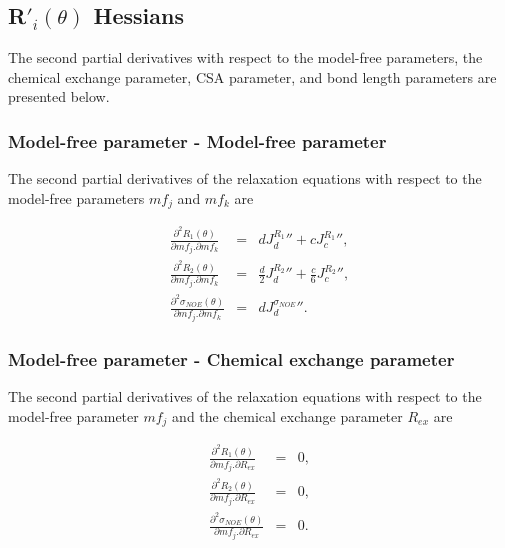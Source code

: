 
\subsection{R$'_i(\theta)$ Hessians}

The second partial derivatives with respect to the model-free parameters, the chemical exchange parameter, CSA parameter, and bond length parameters are presented below.


\subsubsection{Model-free parameter - Model-free parameter}

The second partial derivatives of the relaxation equations with respect to the model-free parameters $mf_j$ and $mf_k$ are

\begin{eqnarray}
    \frac{\partial^2 R_1(\theta)}{\partial mf_j . \partial mf_k} & = & d {J_d^{R_1}}'' + c {J_c^{R_1}}'',                       \label{eq: Ri': d2R1/dmfj.dmfk} \\
    \frac{\partial^2 R_2(\theta)}{\partial mf_j . \partial mf_k} & = & \frac{d}{2} {J_d^{R_2}}'' + \frac{c}{6} {J_c^{R_2}}'',   \label{eq: Ri': d2R2/dmfj.dmfk} \\
    \frac{\partial^2 \sigma_{NOE}(\theta)}{\partial mf_j . \partial mf_k} & = & d {J_d^{\sigma_{NOE}}}''.                     \label{eq: Ri': d2sigmaNOE/dmfj.dmfk}
\end{eqnarray}


\subsubsection{Model-free parameter - Chemical exchange parameter}

The second partial derivatives of the relaxation equations with respect to the model-free parameter $mf_j$ and the chemical exchange parameter $R_{ex}$ are

\begin{eqnarray}
    \frac{\partial^2 R_1(\theta)}{\partial mf_j . \partial R_{ex}} & = & 0,             \label{eq: Ri': d2R1/dmfj.dRex} \\
    \frac{\partial^2 R_2(\theta)}{\partial mf_j . \partial R_{ex}} & = & 0,             \label{eq: Ri': d2R2/dmfj.dRex} \\
    \frac{\partial^2 \sigma_{NOE}(\theta)}{\partial mf_j . \partial R_{ex}} & = & 0.    \label{eq: Ri': d2sigmaNOE/dmfj.dRex}
\end{eqnarray}



